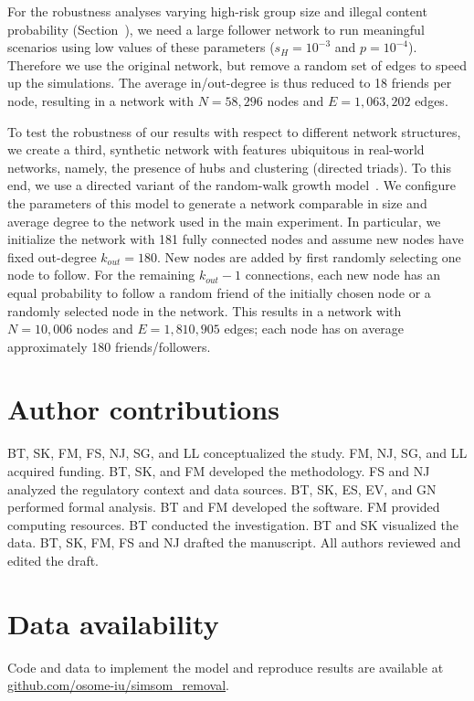 \documentclass{article}
\begin{document}
For the robustness analyses varying high-risk group size and illegal content probability (Section~), we need a large follower network to run meaningful scenarios using low values of these parameters ($s_H=10^{-3}$ and $p=10^{-4}$). 
Therefore we use the original network, but remove a random set of edges to speed up the simulations. The average in/out-degree is thus reduced to 18 friends per node, resulting in a network with $N = 58{,}296$ nodes and $E=1{,}063{,}202$ edges. 

To test the robustness of our results with respect to different network structures, we create a third, synthetic network with features ubiquitous in real-world networks, namely, the presence of hubs and clustering (directed triads). To this end, we use a directed variant of the random-walk growth model~\cite{vazquez03Growing}. 
We configure the parameters of this model to generate a network comparable in size and average degree to the network used in the main experiment. In particular, we initialize the network with 181 fully connected nodes and assume new nodes have fixed out-degree $k_{out}=180$. New nodes are added by first randomly selecting one node to follow. For the remaining  $k_{out} - 1$ connections, each new node has an equal probability to follow a random friend of the initially chosen node or a randomly selected node in the network. This results in a network with $N = 10{,}006$ nodes and $E=1{,}810{,}905$ edges; each node has on average approximately 180 friends/followers. 

\section*{Author contributions}

BT, SK, FM, FS, NJ, SG, and LL conceptualized the study. 
FM, NJ, SG, and LL acquired funding. 
BT, SK, and FM developed the methodology. 
FS and NJ analyzed the regulatory context and data sources. 
BT, SK, ES, EV, and GN performed formal analysis. 
BT and FM developed the software.  
FM provided computing resources. 
BT conducted the investigation. 
BT and SK visualized the data. 
BT, SK, FM, FS and NJ drafted the manuscript. 
All authors reviewed and edited the draft. 

\section*{Data availability}
Code and data to implement the model and reproduce results are available at \url{github.com/osome-iu/simsom_removal}. 
\end{document}
